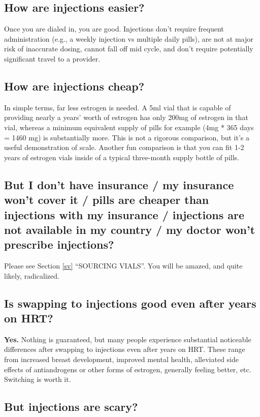 \documentclass{article}
\begin{document}
\subsection{How are injections easier?}

Once you are dialed in, you are good. Injections don’t require frequent administration (e.g., a weekly injection vs multiple daily pills), are not at major risk of inaccurate dosing, cannot fall off mid cycle, and don’t require potentially significant travel to a provider.

\subsection{How are injections cheap?}

In simple terms, far less estrogen is needed. A 5ml vial that is capable of providing nearly a years’ worth of estrogen has only 200mg of estrogen in that vial, whereas a minimum equivalent supply of pills for example (4mg * 365 days = 1460 mg) is substantially more. This is not a rigorous comparison, but it’s a useful demonstration of scale. Another fun comparison is that you can fit 1-2 years of estrogen vials inside of a typical three-month supply bottle of pills.

\subsection{But I don’t have insurance / my insurance won’t cover it / pills are cheaper than injections with my insurance / injections are not available in my country / my doctor won’t prescribe injections?}

Please see Section \ref{sv} “SOURCING VIALS”. You will be amazed, and quite likely, radicalized.

\subsection{Is swapping to injections good even after years on HRT?}

\textbf{Yes.} Nothing is guaranteed, but many people experience substantial noticeable differences after swapping to injections even after years on HRT. These range from increased breast development, improved mental health, alleviated side effects of antiandrogens or other forms of estrogen, generally feeling better, etc. Switching is worth it.

\subsection{But injections are scary?}
\end{document}
